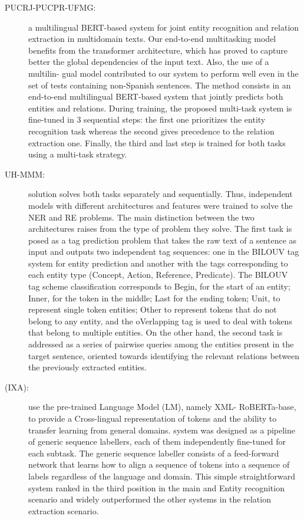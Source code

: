 \documentclass[a4paper,11pt,twocolumn,twoside]{article}
\begin{document}
\begin{description}
  \item[PUCRJ-PUCPR-UFMG:] a multilingual BERT-based system for joint entity recognition and relation extraction
  in multidomain texts. Our end-to-end multitasking model benefits from the transformer architecture,
  which has proved to capture better the global dependencies of the input text. Also, the use of a multilin-
  gual model contributed to our system to perform well even in the set of tests containing non-Spanish
  sentences. The method consists in an end-to-end multilingual
  BERT-based system that jointly predicts both entities and relations. During training, the
  proposed multi-task system is fine-tuned in 3 sequential steps: the first one prioritizes the entity
  recognition task whereas the second gives precedence to the relation extraction one. Finally,
  the third and last step is trained for both tasks using a multi-task strategy.

  \item[UH-MMM:]  solution solves both tasks separately and sequentially. Thus, independent models
  with different architectures and features were trained to solve the NER and RE problems. The
  main distinction between the two architectures raises from the type of problem they solve. The
  first task is posed as a tag prediction problem that takes the raw text of a sentence as input and
  outputs two independent tag sequences: one in the BILOUV tag system for entity prediction and
  another with the tags corresponding to each entity type (Concept, Action, Reference, Predicate).
  The BILOUV tag scheme classification corresponds to Begin, for the start of an entity; Inner, for
  the token in the middle; Last for the ending token; Unit, to represent single token entities; Other
  to represent tokens that do not belong to any entity, and the oVerlapping tag is used to deal
  with tokens that belong to multiple entities. On the other hand, the second task is addressed as
  a series of pairwise queries among the entities present in the target sentence, oriented towards
  identifying the relevant relations between the previously extracted entities.

  \item[(IXA):]  use the pre-trained Language Model (LM), namely XML-
  RoBERTa-base, to provide a Cross-lingual representation of tokens and the ability to transfer learning
  from general domains. system was
  designed as a pipeline of generic sequence labellers, each of them independently fine-tuned for each
  subtask. The generic sequence labeller consists of a feed-forward network that learns how to align
  a sequence of tokens into a sequence of labels regardless of the language and domain. This simple
  straightforward system ranked in the third position in the main and Entity recognition scenario and
  widely outperformed the other systems in the relation extraction scenario.


\end{description}
\end{document}
